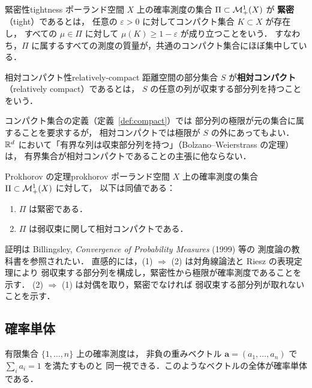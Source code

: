 \begin{definition}{緊密性}{tightness}
  ポーランド空間 $X$ 上の確率測度の集合 $\Pi \subset \mathcal{M}_+^1(X)$ が
  \textbf{緊密}（tight）であるとは，
  任意の $\varepsilon > 0$ に対してコンパクト集合 $K \subset X$ が存在し，
  すべての $\mu \in \Pi$ に対して $\mu(K) \geq 1 - \varepsilon$ が成り立つことをいう．
  すなわち，$\Pi$ に属するすべての測度の質量が，共通のコンパクト集合にほぼ集中している．
\end{definition}

\begin{definition}{相対コンパクト性}{relatively-compact}
  距離空間の部分集合 $S$ が\textbf{相対コンパクト}（relatively compact）であるとは，
  $S$ の任意の列が収束する部分列を持つことをいう．
\end{definition}

コンパクト集合の定義（定義~\ref{def:compact}）では
部分列の極限が元の集合に属することを要求するが，
相対コンパクトでは極限が $S$ の外にあってもよい．
$\mathbb{R}^d$ において「有界な列は収束部分列を持つ」（Bolzano--Weierstrass の定理）は，
有界集合が相対コンパクトであることの主張に他ならない．

\begin{theorem}{Prokhorov の定理}{prokhorov}
  ポーランド空間 $X$ 上の確率測度の集合 $\Pi \subset \mathcal{M}_+^1(X)$ に対して，
  以下は同値である：
  \begin{enumerate}
    \item $\Pi$ は緊密である．
    \item $\Pi$ は弱収束に関して相対コンパクトである．
  \end{enumerate}
\end{theorem}

証明は Billingsley, \textit{Convergence of Probability Measures} (1999) 等の
測度論の教科書を参照されたい．
直感的には，(1) $\Rightarrow$ (2) は対角線論法と Riesz の表現定理により
弱収束する部分列を構成し，緊密性から極限が確率測度であることを示す．
(2) $\Rightarrow$ (1) は対偶を取り，緊密でなければ
弱収束する部分列が取れないことを示す．

\subsection{確率単体}
\label{subsec:simplex}

有限集合 $\{1, \ldots, n\}$ 上の確率測度は，
非負の重みベクトル $\mathbf{a} = (a_1, \ldots, a_n)$ で $\sum_i a_i = 1$ を満たすものと
同一視できる．このようなベクトルの全体が確率単体である．


